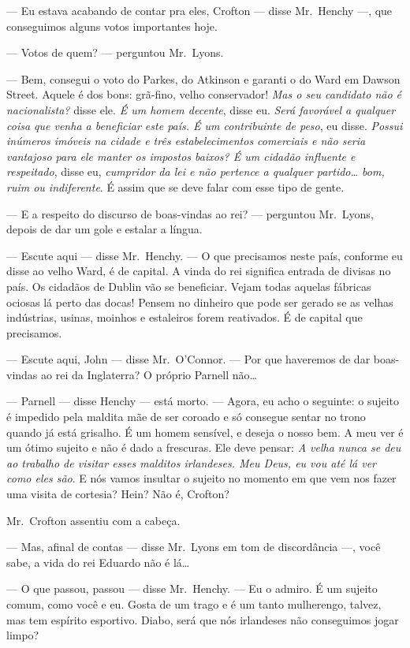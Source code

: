 --- Eu estava acabando de contar pra eles, Crofton --- disse Mr.~Henchy ---,
que conseguimos alguns votos importantes hoje.

--- Votos de quem? --- perguntou Mr.~Lyons.

--- Bem, consegui o voto do Parkes, do Atkinson e garanti o do Ward em Dawson
Street.  Aquele é dos bons: grã-fino, velho conservador!  \textit{Mas o seu
candidato não é nacionalista?} disse ele.  \textit{É um homem
decente}, disse eu.  \textit{Será favorável a qualquer coisa que venha a
beneficiar este país.  É um contribuinte de peso}, eu disse.  \textit{Possui
inúmeros imóveis na cidade e três estabelecimentos comerciais
e não seria vantajoso para ele manter os impostos baixos?  É
um cidadão influente e respeitado}, disse eu, \textit{cumpridor da lei e não
pertence a qualquer partido\ldots{} bom, ruim ou indiferente}.
É assim que se deve falar com esse tipo de gente.

--- E a respeito do discurso de boas-vindas ao rei? --- perguntou Mr.~Lyons,
depois de dar um gole e estalar a língua.

--- Escute aqui --- disse Mr.~Henchy.  --- O que precisamos neste país,
conforme eu disse ao velho Ward, é de capital.  A vinda do rei significa
entrada de divisas no país.  Os cidadãos de Dublin vão se beneficiar.  Vejam
todas aquelas fábricas ociosas lá perto das docas!  Pensem no dinheiro que pode
ser gerado se as velhas indústrias, usinas, moinhos e estaleiros forem
reativados.  É de capital que precisamos.

--- Escute aqui, John --- disse Mr.~O’Connor.  --- Por que haveremos de dar
boas-vindas ao rei da Inglaterra? O próprio Parnell não\ldots{}

--- Parnell --- disse Henchy --- está morto.  --- Agora, eu acho o seguinte: o
sujeito é impedido pela maldita mãe de ser coroado e só consegue sentar no
trono quando já está grisalho.  É um homem sensível, e deseja o nosso bem.  A
meu ver é um ótimo sujeito e não é dado a frescuras.  Ele deve pensar:
\textit{A velha nunca se deu ao trabalho de visitar esses malditos irlandeses.
Meu Deus, eu vou até lá ver como eles são}.  E nós vamos insultar o
sujeito no momento em que vem nos fazer uma visita de cortesia?  Hein?  Não é,
Crofton?

Mr.~Crofton assentiu com a cabeça.

--- Mas, afinal de contas --- disse Mr.~Lyons em tom de discordância ---, você
sabe, a vida do rei Eduardo não é lá\ldots{}

--- O que passou, passou --- disse Mr.~Henchy.  --- Eu o admiro.  É um sujeito
comum, como você e eu.  Gosta de um trago e é um tanto mulherengo, talvez, mas
tem espírito esportivo.  Diabo, será que nós irlandeses não conseguimos jogar
limpo?

